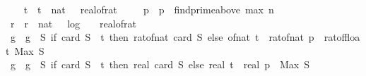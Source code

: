 \begin{isabellebody}
\ \ \isamarkupfalse%
\ t\ \ {\isachardoublequoteopen}t\ {\isacharequal}{\kern0pt}\ nat\ {\isasymlceil}{}{}\ {\isacharslash}{\kern0pt}\ {\isacharparenleft}{\kern0pt}real{\isacharunderscore}{\kern0pt}of{\isacharunderscore}{\kern0pt}rat\ {\isasymdelta}{\isacharparenright}{\kern0pt}\isanewline
\ \ \isamarkupfalse%
\ p\ \ {\isachardoublequoteopen}p\ {\isacharequal}{\kern0pt}\ find{\isacharunderscore}{\kern0pt}prime{\isacharunderscore}{\kern0pt}above\ {\isacharparenleft}{\kern0pt}max\ n\ {}{}{\isacharparenright}{\kern0pt}{\isachardoublequoteclose}\isanewline
\ \ \isamarkupfalse%
\ r\ \ {\isachardoublequoteopen}r\ {\isacharequal}{\kern0pt}\ nat\ {\isacharparenleft}{\kern0pt}{}\ {\isacharasterisk}{\kern0pt}\ {\isasymlceil}log\ {}\ {\isacharparenleft}{\kern0pt}{}\ {\isacharslash}{\kern0pt}\ real{\isacharunderscore}{\kern0pt}of{\isacharunderscore}{\kern0pt}rat\ {\isasymdelta}{\isacharparenright}{\kern0pt}{\isasymrceil}\ {\isacharplus}{\kern0pt}\ {}{}{\isacharparenright}{\kern0pt}{\isachardoublequoteclose}\isanewline
\ \ \isamarkupfalse%
\ g\ \ {\isachardoublequoteopen}g\ {\isacharequal}{\kern0pt}\ {\isacharparenleft}{\kern0pt}{\isasymlambda}S{\isachardot}{\kern0pt}\ if\ card\ S\ {\isacharless}{\kern0pt}\ t\ then\ rat{\isacharunderscore}{\kern0pt}of{\isacharunderscore}{\kern0pt}nat\ {\isacharparenleft}{\kern0pt}card\ S{\isacharparenright}{\kern0pt}\ else\ of{\isacharunderscore}{\kern0pt}nat\ t\ {\isacharasterisk}{\kern0pt}\ rat{\isacharunderscore}{\kern0pt}of{\isacharunderscore}{\kern0pt}nat\ p\ {\isacharslash}{\kern0pt}\ rat{\isacharunderscore}{\kern0pt}of{\isacharunderscore}{\kern0pt}float\ {\isacharparenleft}{\kern0pt}Max\ S{\isacharparenright}{\kern0pt}{\isacharparenright}{\kern0pt}{\isachardoublequoteclose}\isanewline
\ \ \isamarkupfalse%
\ g{\isacharprime}{\kern0pt}\ \ {\isachardoublequoteopen}g{\isacharprime}{\kern0pt}\ {\isacharequal}{\kern0pt}\ {\isacharparenleft}{\kern0pt}{\isasymlambda}S{\isachardot}{\kern0pt}\ if\ card\ S\ {\isacharless}{\kern0pt}\ t\ then\ real\ {\isacharparenleft}{\kern0pt}card\ S{\isacharparenright}{\kern0pt}\ else\ real\ t\ {\isacharasterisk}{\kern0pt}\ real\ p\ {\isacharslash}{\kern0pt}\ Max\ S{\isacharparenright}{\kern0pt}{\isachardoublequoteclose}\isanewline
\ \ \isamarkupfalse%

\end{isabellebody}

